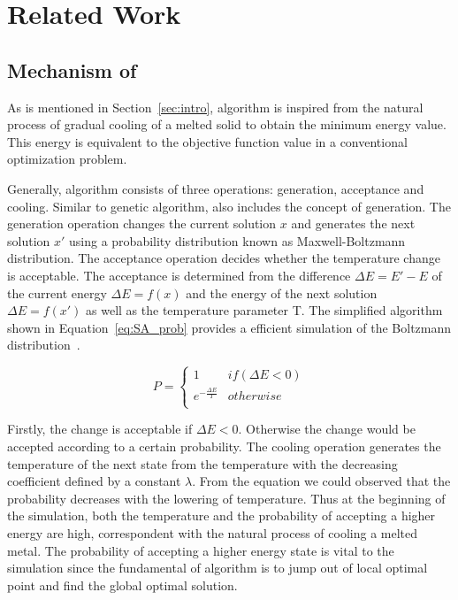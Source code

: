 \section{Related Work}
\label{sec:related}
\subsection{Mechanism of \SA}
As is mentioned in Section~\ref{sec:intro}, \SA algorithm is inspired from the natural process of gradual cooling of a melted solid to obtain the minimum energy value. This energy is equivalent to the objective function value in a conventional optimization problem.

Generally, \SA algorithm consists of three operations: generation, acceptance and cooling. Similar to genetic algorithm, \SA also includes the concept of generation. The generation operation changes the current solution $x$ and generates the next solution $x'$ using a probability distribution known as Maxwell-Boltzmann distribution. The acceptance operation decides whether the temperature change is acceptable. The acceptance is determined from the difference $\Delta E = E'-E$ of the current energy $\Delta E = f(x)$ and the energy of the next solution $\Delta E = f(x')$ as well as the temperature parameter T. The simplified algorithm shown in Equation~\ref{eq:SA_prob} provides a efficient simulation of the Boltzmann distribution~\cite{Hiroyasu:2010}.

\begin{equation}
\label{eq:SA_prob}
P=
\begin{cases}
1 & if(\Delta E < 0) \\
e^{-\frac{\Delta E}{T}}&otherwise \\
\end{cases}
\end{equation}

Firstly, the change is acceptable if $\Delta E < 0$. Otherwise the change would be accepted according to a certain probability. The cooling operation generates the temperature of the next state from the temperature with the decreasing coefficient defined by a constant $\lambda$. From the equation we could observed that the probability decreases with the lowering of temperature. Thus at the beginning of the simulation, both the temperature and the probability of accepting a higher energy are high, correspondent with the natural process of cooling a melted metal. The probability of accepting a higher energy state is vital to the \SA simulation since the fundamental of \SA algorithm is to jump out of local optimal point and find the global optimal solution.
